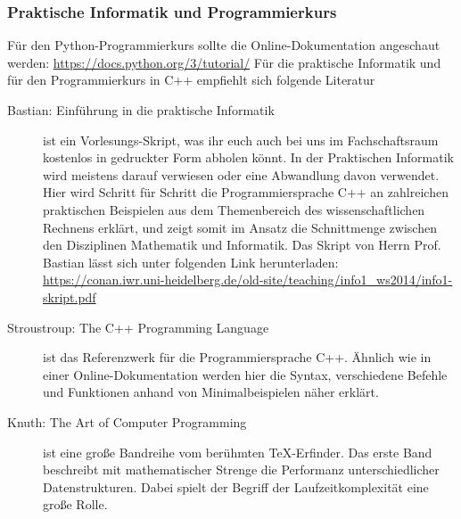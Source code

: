\subsubsection{Praktische Informatik und Programmierkurs}
Für den Python-Programmierkurs sollte die Online-Dokumentation angeschaut werden:
\url{https://docs.python.org/3/tutorial/}
Für die praktische Informatik und für den Programmierkurs in C++ empfiehlt sich folgende Literatur
\begin{description}
\item[Bastian: Einführung in die praktische Informatik]{
	ist ein Vorlesungs-Skript, was ihr euch auch bei uns im Fachschaftsraum kostenlos in gedruckter Form abholen könnt. In der Praktischen Informatik wird meistens darauf verwiesen oder eine Abwandlung davon verwendet. Hier wird Schritt für Schritt die Programmiersprache C++ an zahlreichen praktischen Beispielen aus dem Themenbereich des wissenschaftlichen Rechnens erklärt, und zeigt somit im Ansatz die Schnittmenge zwischen den Disziplinen Mathematik und Informatik. Das Skript von Herrn Prof. Bastian lässt sich unter folgenden Link herunterladen: \url{https://conan.iwr.uni-heidelberg.de/old-site/teaching/info1_ws2014/info1-skript.pdf}}
	
\item[Stroustroup: The C++ Programming Language]{
	ist das Referenzwerk für die Programmiersprache C++. Ähnlich wie in einer Online-Dokumentation werden hier die Syntax, verschiedene Befehle und Funktionen anhand von Minimalbeispielen näher erklärt.}

\item[Knuth: The Art of Computer Programming]{ist eine große Bandreihe vom berühmten TeX-Erfinder. Das erste Band beschreibt mit mathematischer Strenge die Performanz unterschiedlicher Datenstrukturen. Dabei spielt der Begriff der Laufzeitkomplexität eine große Rolle.}

\end{description}

